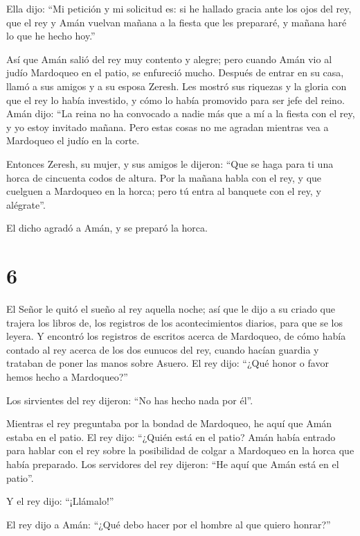 Ella dijo: ``Mi petición y mi solicitud es:
 si he hallado gracia ante los ojos del rey, que el rey y
Amán vuelvan mañana a la fiesta que les prepararé, y mañana haré lo que
he hecho hoy.''

 Así que Amán salió del rey muy contento y alegre; pero
cuando Amán vio al judío Mardoqueo en el patio, se enfureció mucho.
 Después de entrar en su casa, llamó a sus amigos y a su
esposa Zeresh.  Les mostró sus riquezas y la gloria con
que el rey lo había investido, y cómo lo había promovido para ser jefe
del reino.  Amán dijo: ``La reina no ha convocado a nadie
más que a mí a la fiesta con el rey, y yo estoy invitado mañana.
 Pero estas cosas no me agradan mientras vea a Mardoqueo
el judío en la corte.

 Entonces Zeresh, su mujer, y sus amigos le dijeron:
``Que se haga para ti una horca de cincuenta codos de altura. Por la
mañana habla con el rey, y que cuelguen a Mardoqueo en la horca; pero tú
entra al banquete con el rey, y alégrate''.

El dicho agradó a Amán, y se preparó la horca.

\hypertarget{section-5}{%
\section{6}\label{section-5}}

 El Señor le quitó el sueño al rey aquella noche; así que
le dijo a su criado que trajera los libros de, los registros de los
acontecimientos diarios, para que se los leyera.  Y
encontró los registros de escritos acerca de Mardoqueo, de cómo había
contado al rey acerca de los dos eunucos del rey, cuando hacían guardia
y trataban de poner las manos sobre Asuero.  El rey dijo:
``¿Qué honor o favor hemos hecho a Mardoqueo?''

Los sirvientes del rey dijeron: ``No has hecho nada por él''.

 Mientras el rey preguntaba por la bondad de Mardoqueo, he
aquí que Amán estaba en el patio. El rey dijo: ``¿Quién está en el
patio? Amán había entrado para hablar con el rey sobre la posibilidad de
colgar a Mardoqueo en la horca que había preparado.  Los
servidores del rey dijeron: ``He aquí que Amán está en el patio''.

Y el rey dijo: ``¡Llámalo!''

 El rey dijo a Amán: ``¿Qué debo hacer por el hombre al
que quiero honrar?''

